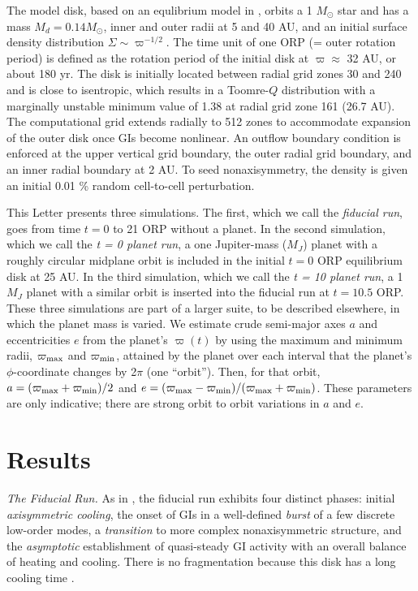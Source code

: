 \documentclass[12pt,manuscript,authoryear]{aastex}
\begin{document}
The model disk, based on an equlibrium model in \citet{pickett2003}, orbits a 1 $M_{\odot}$ star and has a mass $M_d = 0.14 M_{\odot}$, inner and outer radii at 5 and 40 AU, and an initial surface density distribution $\Sigma \sim \varpi^{-1/2}$. The time unit of one ORP (= outer rotation period) is defined as the rotation period of the initial disk at $\varpi \approx$ 32 AU, or about 180 yr. The disk is initially located between radial grid zones 30 and 240 and is close to isentropic, which results in a Toomre-$Q$ distribution with a marginally unstable \citep[see ][]{durisen2007} minimum value of 1.38 at radial grid zone 161 (26.7 AU). The computational grid extends radially to 512 zones to accommodate expansion of the outer disk once GIs become nonlinear. An outflow boundary condition is enforced at the upper vertical grid boundary, the outer radial grid boundary, and an inner radial boundary at 2 AU. To seed nonaxisymmetry, the density is given an initial 0.01 \% random cell-to-cell perturbation.

This Letter presents three simulations. The first, which we call the {\sl fiducial run}, goes from time $t = 0$ to 21 ORP without a planet. In the second simulation, which we call the {\sl t = 0 planet run}, a one Jupiter-mass ($M_J$) planet with a roughly circular midplane orbit is included in the initial $t = 0$ ORP equilibrium disk at 25 AU. In the third simulation, which we call the {\sl t = 10 planet run}, a 1 $M_J$ planet with a similar orbit is inserted into the fiducial run at $t = 10.5$ ORP. These three simulations are part of a larger suite, to be described elsewhere, in which the planet mass is varied. We estimate crude semi-major axes $a$ and eccentricities $e$ from the planet's $\varpi(t)$ by using the maximum and minimum radii, $\varpi_{\rm max}$ and $\varpi_{\rm min}$, attained by the planet over each interval that the planet's $\phi$-coordinate changes by 2$\pi$ (one ``orbit'').  Then, for that orbit, $a = (\varpi_{\rm max}+\varpi_{\rm min})/2$ and $e = (\varpi_{\rm max}-\varpi_{\rm min})/(\varpi_{\rm max}+\varpi_{\rm min})$. These parameters are only indicative; there are strong orbit to orbit variations in $a$ and $e$.

\section{Results}

{\it The Fiducial Run.} As in \citet{mejia2005}, the fiducial run exhibits four distinct phases: initial {\sl axisymmetric cooling}, the onset of GIs in a well-defined {\sl burst} of a few discrete low-order modes, a {\sl transition} to more complex nonaxisymmetric structure, and the {\sl asymptotic} establishment of quasi-steady GI activity with an overall balance of heating and cooling. There is no fragmentation because this disk has a long cooling time \citep{gammie2001,boley2006,boley2007b}.
\end{document}
